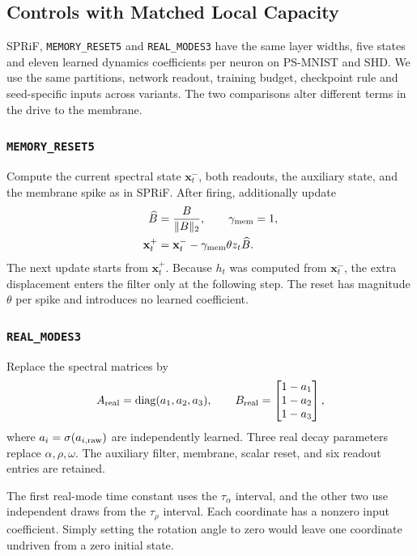 \documentclass[letterpaper,journal]{IEEEtran}
\newcommand{\mr}{\textnormal{\texttt{MEMORY\_RESET5}}}
\newcommand{\rmodes}{\textnormal{\texttt{REAL\_MODES3}}}
\DeclareMathOperator{\diag}{diag}
\begin{document}
\subsection{Controls with Matched Local Capacity}
\label{sec:controls}

SPRiF, \mr{} and \rmodes{} have the same layer widths, five states and eleven learned dynamics coefficients per neuron on PS-MNIST and SHD. We use the same partitions, network readout, training budget, checkpoint rule and seed-specific inputs across variants. The two comparisons alter different terms in the drive to the membrane.

\subsubsection{\mr}
Compute the current spectral state $\mathbf x_t^-$, both readouts, the auxiliary state, and the membrane spike as in SPRiF. After firing, additionally update
\begin{equation}
\begin{aligned}
\widehat B&=\frac{B}{\|B\|_2},\qquad \gamma_{\rm mem}=1,\\
\mathbf x_t^+&=\mathbf x_t^--\gamma_{\rm mem}\theta z_t\widehat B.
\end{aligned}
\label{eq:memory_reset_control}
\end{equation}
The next update starts from $\mathbf x_t^+$. Because $h_t$ was computed from $\mathbf x_t^-$, the extra displacement enters the filter only at the following step. The reset has magnitude $\theta$ per spike and introduces no learned coefficient.

\subsubsection{\rmodes}
Replace the spectral matrices by
\begin{equation}
A_{\rm real}=\diag(a_1,a_2,a_3),\qquad
B_{\rm real}=\begin{bmatrix}1-a_1\\1-a_2\\1-a_3\end{bmatrix},
\label{eq:real_control}
\end{equation}
where $a_i=\sigma(a_{i,\rm raw})$ are independently learned. Three real decay parameters replace $\alpha,\rho,\omega$. The auxiliary filter, membrane, scalar reset, and six readout entries are retained.

The first real-mode time constant uses the $\tau_\alpha$ interval, and the other two use independent draws from the $\tau_\rho$ interval. Each coordinate has a nonzero input coefficient. Simply setting the rotation angle to zero would leave one coordinate undriven from a zero initial state.
\end{document}
